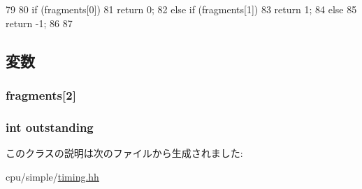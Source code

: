 \begin{DoxyCode}
79         {
80             if (fragments[0]) {
81                 return 0;
82             } else if (fragments[1]) {
83                 return 1;
84             } else {
85                 return -1;
86             }
87         }
\end{DoxyCode}


\subsection{変数}
\hypertarget{classTimingSimpleCPU_1_1SplitMainSenderState_a71710e2d070a54a76c47d9cfc67b9d87}{
\subsubsection[{fragments}]{ {\bf fragments}\mbox{[}2\mbox{]}}}
\label{classTimingSimpleCPU_1_1SplitMainSenderState_a71710e2d070a54a76c47d9cfc67b9d87}
\hypertarget{classTimingSimpleCPU_1_1SplitMainSenderState_a3fc62072fe6e979a41b2e68bda15893a}{
\subsubsection[{outstanding}]{\setlength{\rightskip}{0pt plus 5cm}int {\bf outstanding}}}
\label{classTimingSimpleCPU_1_1SplitMainSenderState_a3fc62072fe6e979a41b2e68bda15893a}


このクラスの説明は次のファイルから生成されました:\begin{DoxyCompactItemize}
\item 
cpu/simple/\hyperlink{timing_8hh}{timing.hh}\end{DoxyCompactItemize}
